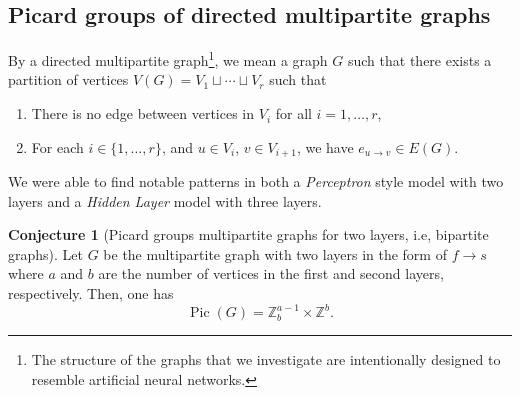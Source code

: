 \documentclass[11pt,reqno]{amsart}
\DeclareMathOperator{\Pic}{Pic}
\theoremstyle{definition}
\newtheorem{conj}[mydef]{Conjecture}
\theoremstyle{plain}
\begin{document}


\subsection{Picard groups of directed multipartite graphs}

By a directed multipartite graph\footnote{The structure of the graphs that we investigate are intentionally designed to resemble artificial neural networks.}, we mean a graph $G$ such that there exists a partition of vertices $V(G)=V_1 \sqcup \cdots \sqcup V_r$ such that\
\begin{enumerate}
	\item 
There is no edge between vertices in $V_i$ for all $i=1,\dots,r$, 
\item 
For each $i \in \{1,\dots,r\}$, and $u \in V_i$, $v \in V_{i+1}$, we have $e_{u\to v} \in E(G)$. 
\end{enumerate}


We were able to find notable patterns in both a \emph{Perceptron} style model with two layers and a
\emph{Hidden Layer} model with three layers.

\begin{conj}[Picard groups multipartite graphs for two layers, i.e, bipartite graphs] 
Let $G$ be the multipartite graph with two layers in the form of $f \rightarrow s$ where $a$ and $b$ are the number of vertices in the first and
second layers, respectively. Then, one has
\[
\Pic(G) = \mathbb{Z}_{b}^{a-1} \times \mathbb{Z}^b.
\]
\end{conj}
\end{document}

